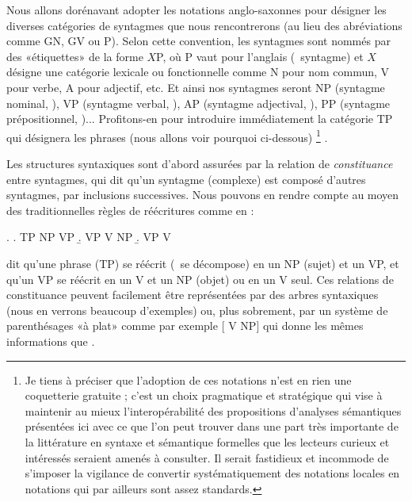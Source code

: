 Nous allons dorénavant adopter les notations anglo-saxonnes pour désigner les diverses catégories de syntagmes que nous rencontrerons (au lieu des abréviations comme GN, GV ou P).  
Selon cette convention, les syntagmes sont nommés par des «étiquettes» de la forme $X$P, où P vaut pour l'anglais  (\ie\ syntagme) et $X$ désigne une catégorie lexicale ou fonctionnelle comme N pour nom commun, V pour verbe, A pour adjectif, etc. 
Et ainsi nos syntagmes seront NP (syntagme nominal, ), VP (syntagme verbal, ), AP (syntagme adjectival, ), PP (syntagme prépositionnel, )...  
Profitons-en pour introduire immédiatement la catégorie TP qui désignera les phrases (nous allons voir pourquoi ci-dessous)%
%
\footnote{Je tiens à préciser que l'adoption de ces notations n'est en rien une coquetterie gratuite ; c'est un choix pragmatique et stratégique qui vise à maintenir au mieux l'interopérabilité des propositions d'analyses sémantiques présentées ici avec ce que l'on peut trouver dans une part très importante de la littérature en syntaxe et sémantique formelles que les lecteurs curieux et intéressés seraient amenés à consulter. 
Il serait fastidieux et incommode de s'imposer la vigilance de convertir systématiquement des notations locales en notations qui par ailleurs sont assez standards.}%
.


Les structures syntaxiques sont d'abord assurées par la relation de \emph{constituance} entre syntagmes, qui dit qu'un syntagme (complexe) est composé d'autres syntagmes, par inclusions successives. Nous pouvons en rendre compte au moyen des traditionnelles règles de réécritures comme en {\Next} :

\ex.
\a. TP {\reecr} NP VP
\b. VP {\reecr} V NP
\b. VP {\reecr} V

\Last[a] dit qu'une phrase (TP) se réécrit (\ie\ se décompose) en un NP (sujet) et un VP, et \Last[b] qu'un VP se réécrit en un V et un NP (objet) ou \Last[c] en un V seul.
Ces relations de constituance peuvent facilement être représentées par des arbres syntaxiques (nous en verrons beaucoup d'exemples) ou, plus sobrement, par un système de parenthésages «à plat» comme par exemple [ V NP] qui donne les mêmes informations que \Last[b]. 


